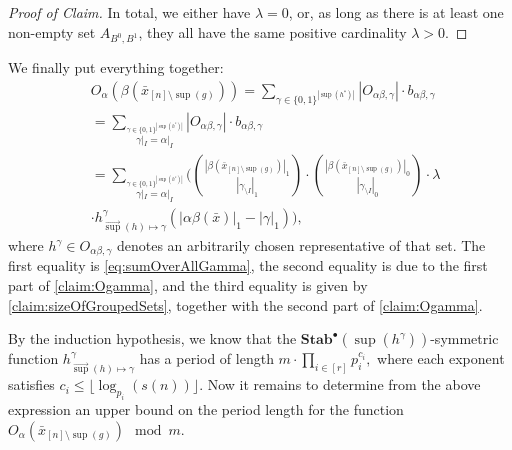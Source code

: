 \documentclass[11pt]{article}
\DeclareMathOperator{\supp}{sup}
\newcommand{\StabP}{\mathbf{Stab}^{\bullet}}
\theoremstyle{definition}
\theoremstyle{plain}
\theoremstyle{remark}
\newenvironment{claimproof}[1][Proof of Claim]{\begin{proof}[#1] \renewcommand{\qedsymbol}{$\lrcorner$}}{ \end{proof}}
\theoremstyle{remark}
\begin{document}
\begin{claimproof}
	In total, we either have $\lambda = 0$, or, as long as there is at least one non-empty set $A_{B^0,B^1}$, they all have the same positive cardinality $\lambda > 0$.
\end{claimproof}

We finally put everything together:
\begin{align*}
	&O_\alpha(\beta(\bar{x}_{[n] \setminus \supp(g)})) = \sum_{\gamma \in \{0,1\}^{|\supp(h^*)|}} |O_{\alpha\beta, \gamma}| \cdot b_{\alpha\beta, \gamma}\\
	&=\sum_{\stackrel{\gamma \in \{0,1\}^{|\supp(h^*)|}}{\gamma|_I = \alpha|_I}} |O_{\alpha\beta, \gamma}| \cdot b_{\alpha\beta, \gamma}\\
	&= \sum_{\stackrel{\gamma \in \{0,1\}^{|\supp(h^*)|}}{\gamma|_I = \alpha|_I}} \Big( \binom{|\beta(\bar{x}_{[n] \setminus \supp(g)})|_1 }{|\gamma_{\setminus I}|_1} \cdot \binom{|\beta(\bar{x}_{[n] \setminus \supp(g)})|_0 }{|\gamma_{\setminus I}|_0} \cdot \lambda\\
	&\cdot h^{\gamma}_{\vec{\supp}(h) \mapsto \gamma}(|\alpha\beta(\bar{x})|_1 - |\gamma|_1) \Big), \tag{$\star$}
\end{align*}
where $h^{\gamma} \in O_{\alpha\beta,\gamma}$ denotes an arbitrarily chosen representative of that set. The first equality is \eqref{eq:sumOverAllGamma}, the second equality is due to the first part of \cref{claim:Ogamma}, and the third equality is given by \cref{claim:sizeOfGroupedSets}, together with the second part of \cref{claim:Ogamma}.

By the induction hypothesis, we know that the $\StabP(\supp(h^\gamma))$-symmetric function $h^{\gamma}_{\vec{\supp}(h) \mapsto \gamma}$ has a period of length 
$
m \cdot \prod_{i \in [r]} p_i^{c_i},
$
where each exponent satisfies $c_i \leq \lfloor \log_{p_i}(s(n)) \rfloor$.
Now it remains to determine from the above expression an upper bound on the period length for the function $O_\alpha(\bar{x}_{[n] \setminus \supp(g)}) \mod m$. 
\end{document}
